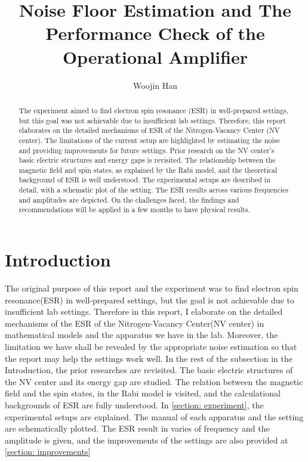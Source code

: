 \documentclass{article}
\begin{document}
\title{Noise Floor Estimation and The Performance Check of the Operational Amplifier}
\author[1]{Woojin Han}
\maketitle

\begin{abstract}
    The experiment aimed to find electron spin resonance (ESR) in well-prepared settings, but this goal was not achievable due to insufficient lab settings.
    Therefore, this report elaborates on the detailed mechanisms of ESR of the Nitrogen-Vacancy Center (NV center).
    The limitations of the current setup are highlighted by estimating the noise and providing improvements for future settings.
    Prior research on the NV center's basic electric structures and energy gaps is revisited.
    The relationship between the magnetic field and spin states, as explained by the Rabi model, and the theoretical background of ESR is well understood.
    The experimental setups are described in detail, with a schematic plot of the setting.
    The ESR results across various frequencies and amplitudes are depicted.
    On the challenges faced, the findings and recommendations will be applied in a few months to have physical results.
\end{abstract}

\section{Introduction}
The original purpose of this report and the experiment was to find electron spin resonance(ESR) in well-prepared settings, but the goal is not achievable due to insufficient lab settings.
Therefore in this report, I elaborate on the detailed mechanisms of the ESR of the Nitrogen-Vacancy Center(NV center) in mathematical models and the apparatus we have in the lab.
Moreover, the limitation we have shall be revealed by the appropriate noise estimation so that the report may help the settings work well.
In the rest of the subsection in the Introduction, the prior researches are revisited.
The basic electric structures of the NV center and its energy gap are studied.
The relation between the magnetic field and the spin states, in the Rabi model is visited, and the calculational backgrounds of ESR are fully understood.
In \ref{section: experiment}, the experimental setups are explained.
The manual of each apparatus and the setting are schematically plotted.
The ESR result in varies of frequency and the amplitude is given, and the improvements of the settings are also provided at \ref{section: improvements}
\end{document}
